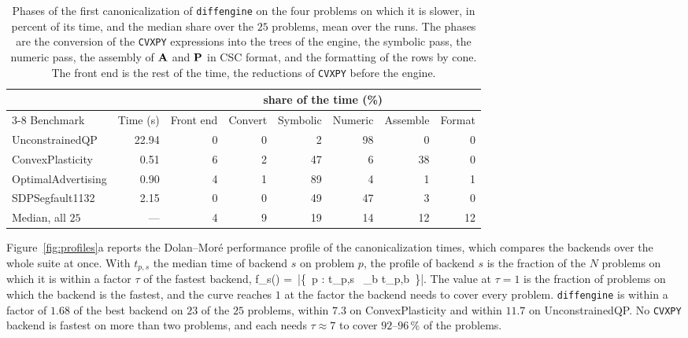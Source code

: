 \begin{table}[htbp]
\centering
\caption[Phases of the first canonicalization on the four slower problems]{Phases of the first
canonicalization of \texttt{diffengine} on the four problems on which it is slower, in percent of
its time, and the median share over the $25$ problems, mean over the runs. The phases are the
conversion of the \texttt{CVXPY} expressions into the trees of the engine, the symbolic pass, the
numeric pass, the assembly of $\mathbf{A}$ and $\mathbf{P}$ in CSC format, and the formatting of the
rows by cone. The front end is the rest of the time, the reductions of \texttt{CVXPY} before the
engine.}
\label{tab:phases}
{\footnotesize
\setlength{\tabcolsep}{4pt}
\begin{tabular}{l r rrrrrr}
\toprule
& & \multicolumn{6}{c}{share of the time (\%)} \\
\cmidrule(lr){3-8}
Benchmark & Time (s) & Front end & Convert & Symbolic & Numeric & Assemble & Format \\
\midrule
UnconstrainedQP      & 22.94 & 0 & 0 & 2 & 98 & 0 & 0 \\
ConvexPlasticity     & 0.51 & 6 & 2 & 47 & 6 & 38 & 0 \\
OptimalAdvertising   & 0.90 & 4 & 1 & 89 & 4 & 1 & 1 \\
SDPSegfault1132      & 2.15 & 0 & 0 & 49 & 47 & 3 & 0 \\
\midrule
Median, all $25$     & ---  & 4 & 9 & 19 & 14 & 12 & 12 \\
\bottomrule
\end{tabular}}
\end{table}

\FloatBarrier

Figure~\ref{fig:profiles}a reports the Dolan--Mor\'e performance profile
\cite{dolan2002} of the canonicalization times, which compares the backends over the whole
suite at once. With $t_{p,s}$ the median time of backend $s$ on problem $p$, the profile of
backend $s$ is the fraction of the $N$ problems on which it is within a factor $\tau$ of the
fastest backend,
\BEQ\label{eq:perf-profile}
f_s(\tau) = \,\bigl|\{\, p : t_{p,s} \le \tau \, \textstyle\min_b t_{p,b}
\,\}\bigr|.
\EEQ
The value at $\tau = 1$ is the fraction of
problems on which the backend is the fastest, and the curve reaches $1$ at the factor the
backend needs to cover every problem. \texttt{diffengine} is within a factor of $1.68$ of
the best backend on $23$ of the $25$ problems, within $7.3$ on ConvexPlasticity and within
$11.7$ on UnconstrainedQP. No
\texttt{CVXPY} backend is fastest on more than two problems, and each needs
$\tau \approx 7$ to cover $92$--$96\,\%$ of the problems.

